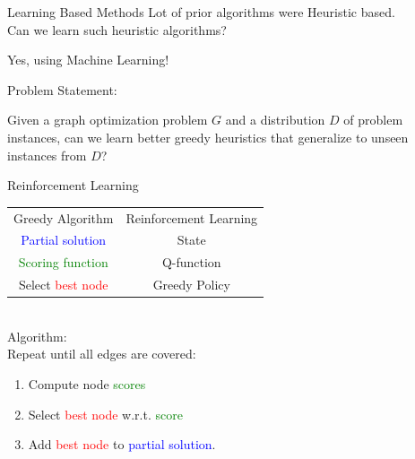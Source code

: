 \documentclass[9pt]{beamer}
\begin{document}
\begin{frame}{Learning Based Methods}
\vspace{-40pt}
Lot of prior algorithms were Heuristic based.
\bigskip\\
Can we learn such heuristic algorithms?\\ 
\begin{center}
    Yes, using Machine Learning!
\end{center}

Problem Statement:
\begin{center}
    Given a graph optimization problem $G$
and a distribution $D$ of problem instances,
can we learn better greedy heuristics that
generalize to unseen instances from $D$?
\end{center}

\end{frame}
\begin{frame}{Reinforcement Learning}
\begin{tabular}{cc}
     Greedy Algorithm & Reinforcement Learning  \\
     \textcolor{blue}{Partial solution}&State\\
     \textcolor{green}{Scoring function}&Q-function\\
Select \textcolor{red}{best node} &Greedy Policy
\end{tabular}
\bigskip\\
Algorithm:\\
Repeat until all edges are covered:
\begin{enumerate}
    \item Compute node \textcolor{green}{scores}
\item Select \textcolor{red}{best node} w.r.t. \textcolor{green}{score}
\item Add \textcolor{red}{best node} to \textcolor{blue}{partial solution}.
\end{enumerate}
\end{frame}
\end{document}
